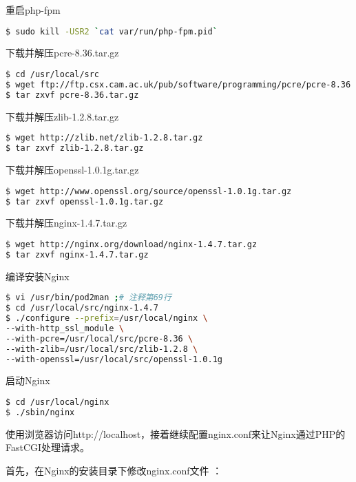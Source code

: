 重启php-fpm


\begin{lstlisting}[language=bash]
$ sudo kill -USR2 `cat var/run/php-fpm.pid`
\end{lstlisting}



下载并解压pcre-8.36.tar.gz

\begin{lstlisting}[language=bash]
$ cd /usr/local/src
$ wget ftp://ftp.csx.cam.ac.uk/pub/software/programming/pcre/pcre-8.36.tar.gz
$ tar zxvf pcre-8.36.tar.gz
\end{lstlisting}


下载并解压zlib-1.2.8.tar.gz


\begin{lstlisting}[language=bash]
$ wget http://zlib.net/zlib-1.2.8.tar.gz
$ tar zxvf zlib-1.2.8.tar.gz
\end{lstlisting}

下载并解压openssl-1.0.1g.tar.gz


\begin{lstlisting}[language=bash]
$ wget http://www.openssl.org/source/openssl-1.0.1g.tar.gz
$ tar zxvf openssl-1.0.1g.tar.gz
\end{lstlisting}

下载并解压nginx-1.4.7.tar.gz


\begin{lstlisting}[language=bash]
$ wget http://nginx.org/download/nginx-1.4.7.tar.gz
$ tar zxvf nginx-1.4.7.tar.gz
\end{lstlisting}


编译安装Nginx


\begin{lstlisting}[language=bash]
$ vi /usr/bin/pod2man ;# 注释第69行
$ cd /usr/local/src/nginx-1.4.7
$ ./configure --prefix=/usr/local/nginx \
--with-http_ssl_module \
--with-pcre=/usr/local/src/pcre-8.36 \
--with-zlib=/usr/local/src/zlib-1.2.8 \
--with-openssl=/usr/local/src/openssl-1.0.1g
\end{lstlisting}

启动Nginx

\begin{lstlisting}[language=bash]
$ cd /usr/local/nginx
$ ./sbin/nginx
\end{lstlisting}

使用浏览器访问http://localhost，接着继续配置nginx.conf来让Nginx通过PHP的FastCGI处理请求。

首先，在Nginx的安装目录下修改nginx.conf文件	：


